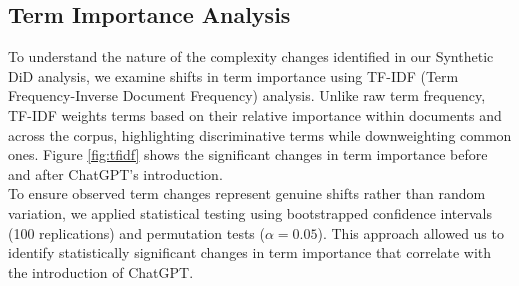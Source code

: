 \subsection{Term Importance Analysis}
To understand the nature of the complexity changes identified in our Synthetic DiD analysis, we examine shifts in term importance using TF-IDF (Term Frequency-Inverse Document Frequency) analysis. Unlike raw term frequency, TF-IDF weights terms based on their relative importance within documents and across the corpus, highlighting discriminative terms while downweighting common ones. Figure \ref{fig:tfidf} shows the significant changes in term importance before and after ChatGPT's introduction.\\

To ensure observed term changes represent genuine shifts rather than random variation, we applied statistical testing using bootstrapped confidence intervals (100 replications) and permutation tests ($\alpha = 0.05$). This approach allowed us to identify statistically significant changes in term importance that correlate with the introduction of ChatGPT.
